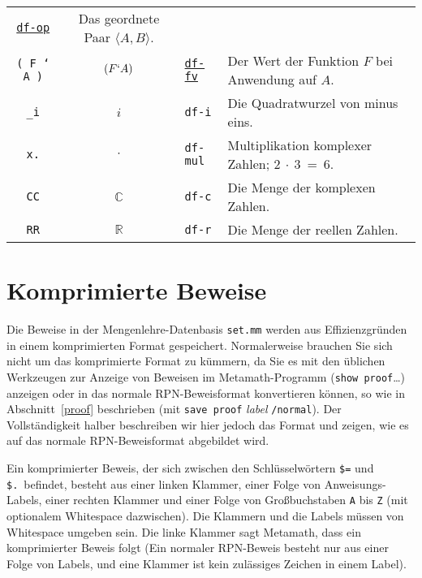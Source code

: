 {\begin{longtabu}   { @{} c c l X }
  \hyperref[df-op]{\texttt{df-op}} &
  Das geordnete Paar $\langle A , B \rangle$. \\
 \texttt{( F ` A )} & $ ( F ` A ) $ &
  \hyperref[df-fv]{\texttt{df-fv}} &
  Der Wert der Funktion $F$ bei Anwendung auf $A$. \\
 \texttt{\_i} & $ i $ &
 \texttt{df-i} &
  Die Quadratwurzel von minus eins. \\
 \texttt{x.} & $ \cdot $ &
 \texttt{df-mul} &
  Multiplikation komplexer Zahlen; $2~\cdot~3~=~6$. \\
 \texttt{CC} & $ \mathbb{C} $ &
\texttt{df-c} &
Die Menge der komplexen Zahlen. \\
\texttt{RR} & $ \mathbb{R} $ &
  \texttt{df-r} &
  Die Menge der reellen Zahlen. \\
\end{longtabu}
} %

\chapter{Komprimierte Beweise}
\label{compressed}

Die Beweise in der Mengenlehre-Datenbasis \texttt{set.mm} werden aus Effizienzgründen in einem komprimierten Format gespeichert.  Normalerweise brau\-chen Sie sich nicht um das komprimierte Format zu kümmern, da Sie es mit den üblichen Werkzeugen zur Anzeige von Beweisen im Metamath-Programm (\texttt{show proof}\ldots) anzeigen oder in das normale RPN-Beweisformat konvertieren können, so wie in Abschnitt~\ref{proof} beschrieben (mit \texttt{save proof} {\em label} \texttt{/normal}).  Der Vollständigkeit halber beschreiben wir hier jedoch das Format und zeigen, wie es auf das normale RPN-Beweisformat abgebildet wird. 

Ein komprimierter Beweis, der sich zwischen den Schlüsselwörtern \texttt{\$=} und \texttt{\$.}\ befindet, besteht aus einer linken Klammer, einer Folge von Anweisungs-Labels, einer rechten Klammer und einer Folge von Großbuchstaben \texttt{A} bis \texttt{Z} (mit optionalem Whitespace dazwischen).  Die Klammern und die Labels müssen von Whitespace umgeben sein.  Die linke Klammer sagt Metamath, dass ein komprimierter Beweis folgt (Ein normaler RPN-Beweis besteht nur aus einer Folge von Labels, und eine Klammer ist kein zulässiges Zeichen in einem Label).

